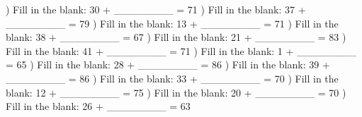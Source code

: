 \documentclass{article}%
\begin{document}
\newline%
) Fill in the blank: 30 + \_\_\_\_\_\_\_\_ = 71%
\newline%
\newline%
) Fill in the blank: 37 + \_\_\_\_\_\_\_\_ = 79%
\newline%
\newline%
) Fill in the blank: 13 + \_\_\_\_\_\_\_\_ = 71%
\newline%
\newline%
) Fill in the blank: 38 + \_\_\_\_\_\_\_\_ = 67%
\newline%
\newline%
) Fill in the blank: 21 + \_\_\_\_\_\_\_\_ = 83%
\newline%
\newline%
) Fill in the blank: 41 + \_\_\_\_\_\_\_\_ = 71%
\newline%
\newline%
) Fill in the blank: 1 + \_\_\_\_\_\_\_\_ = 65%
\newline%
\newline%
) Fill in the blank: 28 + \_\_\_\_\_\_\_\_ = 86%
\newline%
\newline%
) Fill in the blank: 39 + \_\_\_\_\_\_\_\_ = 86%
\newline%
\newline%
) Fill in the blank: 33 + \_\_\_\_\_\_\_\_ = 70%
\newline%
\newline%
) Fill in the blank: 12 + \_\_\_\_\_\_\_\_ = 75%
\newline%
\newline%
) Fill in the blank: 20 + \_\_\_\_\_\_\_\_ = 70%
\newline%
\newline%
) Fill in the blank: 26 + \_\_\_\_\_\_\_\_ = 63%
\newline%
\end{document}
